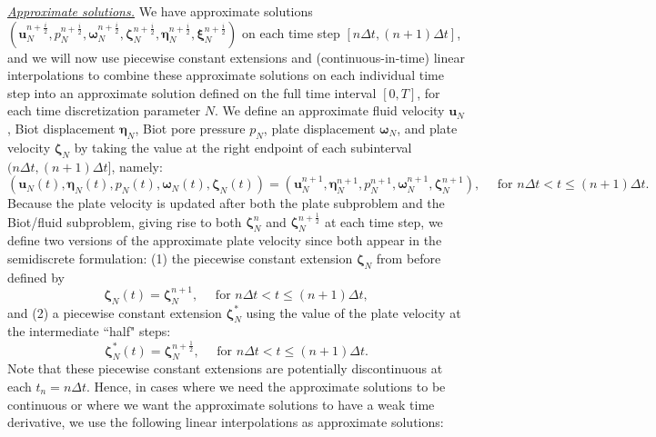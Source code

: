 \documentclass[11pt]{article}
\newcommand{\bd}{\boldsymbol}
\theoremstyle{definition}
\begin{document}
\medskip

\noindent \underline{\textit{Approximate solutions.}} We have approximate solutions $\left(\bd{u}^{n + \frac{i}{2}}_{N}, p^{n + \frac{i}{2}}_{N}, \bd{\omega}^{n + \frac{i}{2}}_{N}, \bd{\zeta}^{n + \frac{i}{2}}_{N}, \bd{\eta}^{n + \frac{i}{2}}_{N}, \bd{\xi}^{n + \frac{i}{2}}_{N}\right)$ on each time step $[n\Delta t, (n + 1)\Delta t]$, and we will now use piecewise constant extensions and (continuous-in-time) linear interpolations to combine these approximate solutions on each individual time step into an approximate solution defined on the full time interval $[0, T]$, for each time discretization parameter $N$. We define an approximate fluid velocity $\bd{u}_{N}$, Biot displacement $\bd{\eta}_{N}$, Biot pore pressure $p_{N}$, plate displacement $\bd{\omega}_{N}$, and plate velocity $\bd{\zeta}_{N}$ by taking the value at the right endpoint of each subinterval $(n\Delta t, (n + 1)\Delta t]$, namely:
\begin{equation}\label{approxdef}
(\bd{u}_{N}(t), \bd{\eta}_{N}(t), p_{N}(t), \bd{\omega}_{N}(t), \bd{\zeta}_{N}(t)) = (\bd{u}^{n + 1}_{N}, \bd{\eta}^{n + 1}_{N}, p^{n + 1}_{N}, \bd{\omega}^{n + 1}_{N}, \bd{\zeta}^{n + 1}_{N}), \quad \text{ for $n \Delta t < t \le (n + 1)\Delta t$}.
\end{equation}
Because the plate velocity is updated after both the plate subproblem and the Biot/fluid subproblem, giving rise to both $\bd{\zeta}^{n}_{N}$ and $\bd{\zeta}^{n + \frac{1}{2}}_{N}$ at each time step, we define two versions of the approximate plate velocity since both appear in the semidiscrete formulation: (1) the piecewise constant extension $\bd{\zeta}_{N}$ from before defined by
\begin{equation}\label{zetaN}
\bd{\zeta}_{N}(t) = \bd{\zeta}^{n + 1}_{N}, \quad \text{ for } n\Delta t < t \le (n + 1)\Delta t,
\end{equation}
and (2) a piecewise constant extension $\bd{\zeta}^{*}_{N}$ using the value of the plate velocity at the intermediate ``half" steps:
\begin{equation}\label{zetastar}
\bd{\zeta}_{N}^{*}(t) = \bd{\zeta}^{n + \frac{1}{2}}_{N}, \quad \text{ for } n\Delta t < t \le (n + 1)\Delta t.
\end{equation}
Note that these piecewise constant extensions are potentially discontinuous at each $t_{n} = n\Delta t$. Hence, in cases where we need the approximate solutions to be continuous or where we want the approximate solutions to have a weak time derivative, we use the following linear interpolations as approximate solutions:
\end{document}
